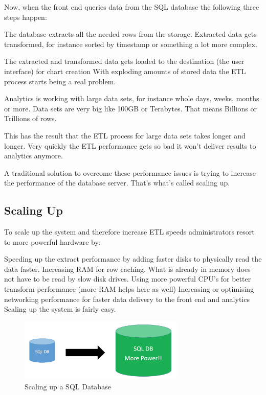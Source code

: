 \documentclass[12pt, numbers=noenddot]{scrreprt} %
\begin{document}
Now, when the front end queries data from the SQL database the following three steps happen:

The database extracts all the needed rows from the storage. Extracted data gets transformed, for instance sorted by timestamp or something a lot more complex.

The extracted and transformed data gets loaded to the destination (the user interface) for chart creation
With exploding amounts of stored data the ETL process starts being a real problem.

Analytics is working with large data sets, for instance whole days, weeks, months or more. Data sets are very big like 100GB or Terabytes. That means Billions or Trillions of rows.

This has the result that the ETL process for large data sets takes longer and longer. Very quickly the ETL performance gets so bad it won’t deliver results to analytics anymore.

A traditional solution to overcome these performance issues is trying to increase the performance of the database server. That’s what’s called scaling up.

\subsection{Scaling Up}
To scale up the system and therefore increase ETL speeds administrators resort to more powerful hardware by:

Speeding up the extract performance by adding faster disks to physically read the data faster.
Increasing RAM for row caching. What is already in memory does not have to be read by slow disk drives.
Using more powerful CPU’s for better transform performance (more RAM helps here as well)
Increasing or optimising networking performance for faster data delivery to the front end and analytics
Scaling up the system is fairly easy.

\begin{figure}[htbp]
  \centering
     \includegraphics[width=0.7\textwidth]{images/SQL-Scaling-UP}
  \caption{Scaling up a SQL Database}
  \label{fig:Bild1}
\end{figure}
\end{document}
